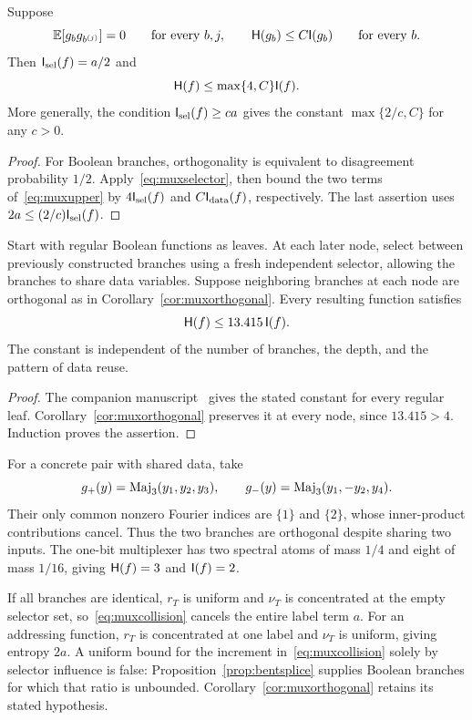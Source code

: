 \begin{corollary}\label{cor:muxorthogonal}
Suppose
\[
 \mathbb E[g_b g_{b^{(j)}}]=0\qquad\text{for every }b,j,
 \qquad \mathsf H(g_b)\le C\mathsf I(g_b)\qquad\text{for every }b.
\]
Then $\mathsf I_{\rm sel}(f)=a/2$ and
\[
 \mathsf H(f)\le\max\{4,C\}\mathsf I(f).
\]
More generally, the condition $\mathsf I_{\rm sel}(f)\ge ca$ gives the constant $\max\{2/c,C\}$ for any $c>0$.
\end{corollary}
\begin{proof}
For Boolean branches, orthogonality is equivalent to disagreement probability $1/2$. Apply~\eqref{eq:muxselector}, then bound the two terms of~\eqref{eq:muxupper} by $4\mathsf I_{\rm sel}(f)$ and $C\mathsf I_{\rm data}(f)$, respectively. The last assertion uses $2a\le(2/c)\mathsf I_{\rm sel}(f)$.
\end{proof}

\begin{corollary}\label{cor:thresholdmux}
Start with regular Boolean functions as leaves. At each later node, select between previously constructed branches using a fresh independent selector, allowing the branches to share data variables. Suppose neighboring branches at each node are orthogonal as in Corollary~\ref{cor:muxorthogonal}. Every resulting function satisfies
\[
 \mathsf H(f)\le13.415\,\mathsf I(f).
\]
The constant is independent of the number of branches, the depth, and the pattern of data reuse.
\end{corollary}
\begin{proof}
The companion manuscript~\cite{Threshold} gives the stated constant for every regular leaf. Corollary~\ref{cor:muxorthogonal} preserves it at every node, since $13.415>4$. Induction proves the assertion.
\end{proof}

For a concrete pair with shared data, take
\[
 g_+(y)=\operatorname{Maj}_3(y_1,y_2,y_3),\qquad
 g_-(y)=\operatorname{Maj}_3(y_1,-y_2,y_4).
\]
Their only common nonzero Fourier indices are $\{1\}$ and $\{2\}$, whose inner-product contributions cancel. Thus the two branches are orthogonal despite sharing two inputs. The one-bit multiplexer has two spectral atoms of mass $1/4$ and eight of mass $1/16$, giving $\mathsf H(f)=3$ and $\mathsf I(f)=2$.

\begin{remark}
If all branches are identical, $r_T$ is uniform and $\nu_T$ is concentrated at the empty selector set, so~\eqref{eq:muxcollision} cancels the entire label term $a$. For an addressing function, $r_T$ is concentrated at one label and $\nu_T$ is uniform, giving entropy $2a$. A uniform bound for the increment in~\eqref{eq:muxcollision} solely by selector influence is false: Proposition~\ref{prop:bentsplice} supplies Boolean branches for which that ratio is unbounded. Corollary~\ref{cor:muxorthogonal} retains its stated hypothesis.
\end{remark}


